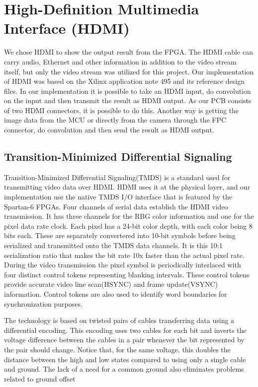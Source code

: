 \section{High-Definition Multimedia Interface (HDMI)}
We chose HDMI to show the output result from the FPGA.
The HDMI cable can carry audio, Ethernet and other information in addition to the video stream itself, but only the video stream was utilized for this project.
Our implementation of HDMI was based on the Xilinx application note 495\cite{xapp495} and its reference design files. In our implementation it is possible to take an HDMI input, do convolution on the input and then transmit the result as HDMI output. As our PCB consists of two HDMI connectors, it is possible to do this. Another way is getting the image data from the MCU or directly from the camera through the FPC connector, do convolution and then send the result as HDMI output.

\subsection{Transition-Minimized Differential Signaling}
Transition-Minimized Differential Signaling(TMDS) is a standard used for transmitting video data over HDMI. HDMI uses it at the physical layer, and our implementation use the native TMDS I/O interface that is featured by the Spartan-6 FPGAs.
Four channels of serial data establish the HDMI video transmission. It has three channels for the RBG color information and one for the pixel data rate clock. Each pixel has a 24-bit color depth, with each color being 8 bits each. These are separately convertered into 10-bit symbols before being serialized and transmitted onto the TMDS data channels. It is this 10:1 serialization ratio that makes the bit rate 10x faster than the actual pixel rate. During the video transmission the pixel symbol is periodically interlaced with four distinct control tokens representing blanking intervals. These control tokens provide accurate video line scan(HSYNC) and frame update(VSYNC) information. Control tokens are also used to identify word boundaries for synchronization purposes.


The technology is based on twisted pairs of cables transferring data using a differential encoding.
This encoding uses two cables for each bit and inverts the voltage difference between the cables in a pair whenever the bit represented by the pair should change.
Notice that, for the same voltage, this doubles the distance between the high and low states compared to using only a single cable and ground.
The lack of a need for a common ground also eliminates problems related to ground offset

